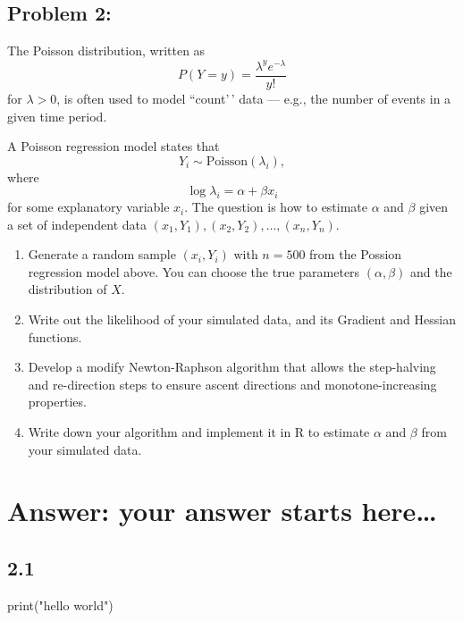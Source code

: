 \documentclass[
]{article}
\newenvironment{Shaded}{\begin{snugshade}}{\end{snugshade}}
\newcommand{\BuiltInTok}[1]{#1}
\newcommand{\NormalTok}[1]{#1}
\newcommand{\StringTok}[1]{\textcolor[rgb]{0.31,0.60,0.02}{#1}}
\begin{document}
\hypertarget{problem-2}{%
\subsection{Problem 2:}\label{problem-2}}

The Poisson distribution, written as\\
\[P(Y=y) = \frac{\lambda^y e^{-\lambda}}{y!}\] for \(\lambda > 0\), is
often used to model ``count'\,' data --- e.g., the number of events in a
given time period.

A Poisson regression model states that
\[Y_i \sim \textrm{Poisson}(\lambda_i),\] where
\[\log \lambda_i = \alpha + \beta x_i \] for some explanatory variable
\(x_i\). The question is how to estimate \(\alpha\) and \(\beta\) given
a set of independent data
\((x_1, Y_1), (x_2, Y_2), \ldots, (x_n, Y_n)\).

\begin{enumerate}
\item Generate a random sample $(x_i, Y_i)$ with $n=500$ from the Possion regression model above. 
You can choose the true parameters $(\alpha,\beta)$ and the distribution of $X$.

\item Write out the likelihood of your simulated data, and its Gradient and Hessian functions. 

\item  Develop a modify Newton-Raphson algorithm that allows the step-halving and re-direction steps
to ensure ascent directions and monotone-increasing properties. 

\item Write down your algorithm and implement it in R to estimate $\alpha$ and $\beta$ from your simulated data.
\end{enumerate}

\hypertarget{answer-your-answer-starts-here-1}{%
\section{Answer: your answer starts
here\ldots{}}\label{answer-your-answer-starts-here-1}}

\hypertarget{section}{%
\subsection{2.1}\label{section}}

\begin{Shaded}
\begin{Highlighting}[]
\BuiltInTok{print}\NormalTok{(}\StringTok{"hello world"}\NormalTok{)}
\end{Highlighting}
\end{Shaded}
\end{document}
